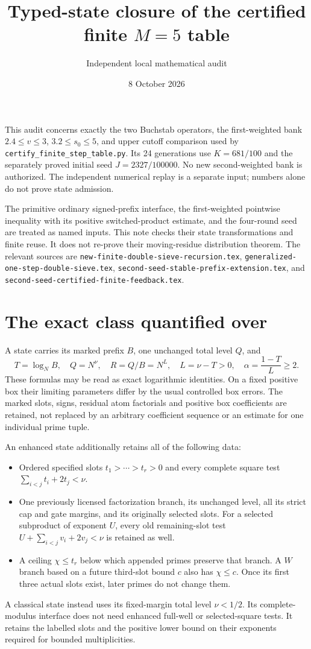 \documentclass[11pt]{article}
\title{Typed-state closure of the certified finite $M=5$ table}
\author{Independent local mathematical audit}
\date{8 October 2026}
\begin{document}
\maketitle

This audit concerns exactly the two Buchstab operators, the first-weighted
bank $2.4\le v\le3$, $3.2\le s_0\le5$, and upper cutoff comparison
used by \texttt{certify\_finite\_step\_table.py}. Its 24 generations
use $K=681/100$ and the separately proved initial seed $J=2327/100000$.
No new second-weighted bank is authorized. The independent numerical
replay is a separate input; numbers alone do not prove state admission.

The primitive ordinary signed-prefix interface, the first-weighted
pointwise inequality with its positive switched-product estimate, and
the four-round seed are treated as named inputs. This note checks their
state transformations and finite reuse. It does not re-prove their
moving-residue distribution theorem. The relevant sources are
\texttt{new-finite-double-sieve-recursion.tex},
\texttt{generalized-one-step-double-sieve.tex},
\texttt{second-seed-stable-prefix-extension.tex}, and
\texttt{second-seed-certified-finite-feedback.tex}.

\section{The exact class quantified over}
A state carries its marked prefix $B$, one unchanged total level $Q$,
and
\[
 T=\log_N B,\quad Q=N^\nu,\quad R=Q/B=N^L,\quad
 L=\nu-T>0,\quad \alpha=\frac{1-T}{L}\ge2.
\]
These formulas may be read as exact logarithmic identities. On a fixed
positive box their limiting parameters differ by the usual controlled
box errors. The marked slots, signs, residual atom factorials and
positive box coefficients are retained, not replaced by an arbitrary
coefficient sequence or an estimate for one individual prime tuple.

An enhanced state additionally retains all of the following data:
\begin{itemize}
\item Ordered specified slots $t_1>\cdots>t_r>0$ and every complete
square test $\sum_{i<j}t_i+2t_j<\nu$.
\item One previously licensed factorization branch, its unchanged level,
all its strict cap and gate margins, and its originally selected slots.
For a selected subproduct of exponent $U$, every old remaining-slot
test $U+\sum_{i<j}v_i+2v_j<\nu$ is retained as well.
\item A ceiling $\chi\le t_r$ below which appended primes preserve that
branch. A $W$ branch based on a future third-slot bound $c$ also has
$\chi\le c$. Once its first three actual slots exist, later primes do
not change them.
\end{itemize}
A classical state instead uses its fixed-margin total level $\nu<1/2$.
Its complete-modulus interface does not need enhanced full-well or
selected-square tests. It retains the labelled slots and the positive
lower bound on their exponents required for bounded multiplicities.
\end{document}
